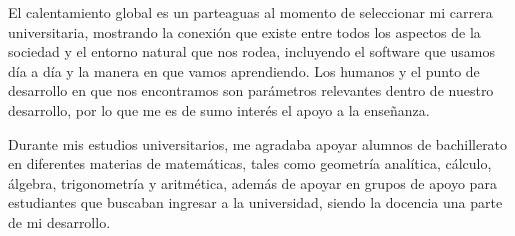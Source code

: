\documentclass[letterpaper]{twentysecondcv} %
\begin{document}
El calentamiento global es un parteaguas al momento de seleccionar mi carrera universitaria, mostrando la conexión que existe entre todos los aspectos de la sociedad y el entorno natural que nos rodea, incluyendo el software que usamos día a día y la manera en que vamos aprendiendo. Los humanos y el punto de desarrollo en que nos encontramos son parámetros relevantes dentro de nuestro desarrollo, por lo que me es de sumo interés el apoyo a la enseñanza. 

Durante mis estudios universitarios, me agradaba apoyar alumnos de bachillerato en diferentes materias de matemáticas, tales como geometría analítica, cálculo, álgebra, trigonometría y aritmética, además de apoyar en grupos de apoyo para estudiantes que buscaban ingresar a la universidad, siendo la docencia una parte de mi desarrollo.








\end{document}
